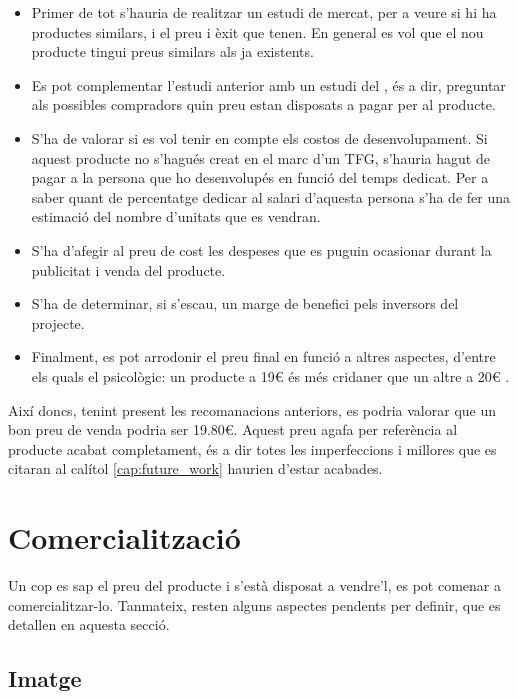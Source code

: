 \begin{itemize}
    \item Primer de tot s'hauria de realitzar un estudi de mercat, per a veure
    si hi ha productes similars, i el preu i èxit que tenen. En general es vol
    que el nou producte tingui preus similars als ja existents.
    \item Es pot complementar l'estudi anterior amb un estudi del ,
    és a dir, preguntar als possibles compradors quin preu estan disposats a
    pagar per al producte.
    \item S'ha de valorar si es vol tenir en compte els costos de
    desenvolupament. Si aquest producte no s'hagués creat en el marc d'un TFG,
    s'hauria hagut de pagar a la persona que ho desenvolupés en funció del
    temps dedicat. Per a saber quant de percentatge dedicar al salari d'aquesta
    persona s'ha de fer una estimació del nombre d'unitats que es vendran.
    \item S'ha d'afegir al preu de cost les despeses que es puguin ocasionar
    durant la publicitat i venda del producte.
    \item S'ha de determinar, si s'escau, un marge de benefici pels inversors
    del projecte.
    \item Finalment, es pot arrodonir el preu final en funció a altres aspectes,
    d'entre els quals el psicològic: un producte a 19€ és més cridaner que un
    altre a 20€ \cite{kumar2017impact}.
\end{itemize}

Així doncs, tenint present les recomanacions anteriors, es podria valorar que
un bon preu de venda podria ser 19.80€. Aquest preu agafa per referència al
producte acabat completament, és a dir totes les imperfeccions i millores que
es citaran al calítol \ref{cap:future_work} haurien d'estar acabades.

\section{Comercialització}

Un cop es sap el preu del producte i s'està disposat a vendre'l, es pot
comenar a comercialitzar-lo. Tanmateix, resten alguns aspectes pendents per
definir, que es detallen en aquesta secció.

\subsection{Imatge}

